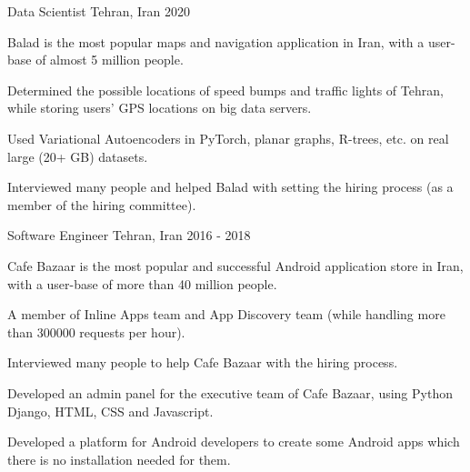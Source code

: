 

\begin{cventries}

 \cventry
    {} %
    {Data Scientist} %
    {Tehran, Iran} %
    {2020} %
    {
      \begin{cvitems} %
        \item {Balad is the most popular maps and navigation application in Iran, with a user-base of almost 5 million people.}
        \item {Determined the possible locations of speed bumps and traffic lights of Tehran, while storing users' GPS locations on big data servers.}
        \item {Used Variational Autoencoders in PyTorch, planar graphs, R-trees, etc. on real large (20+ GB) datasets.}
        \item {Interviewed many people and helped Balad with setting the hiring process (as a member of the hiring committee).}
      \end{cvitems}
    }

  \cventry
    {} %
    {Software Engineer} %
    {Tehran, Iran} %
    {2016 - 2018} %
    {
      \begin{cvitems} %
        \item {Cafe Bazaar is the most popular and successful Android application store in Iran, with a user-base of more than 40 million people.}
        \item {A member of Inline Apps team and App Discovery team (while handling more than 300000 requests per hour).}
        \item {Interviewed many people to help Cafe Bazaar with the hiring process.}
        \item {Developed an admin panel for the executive team of Cafe Bazaar, using Python Django, HTML, CSS and Javascript.}
        \item {Developed a platform for Android developers to create some Android apps which there is no installation needed for them.}
      \end{cvitems}
    }


\end{cventries}
